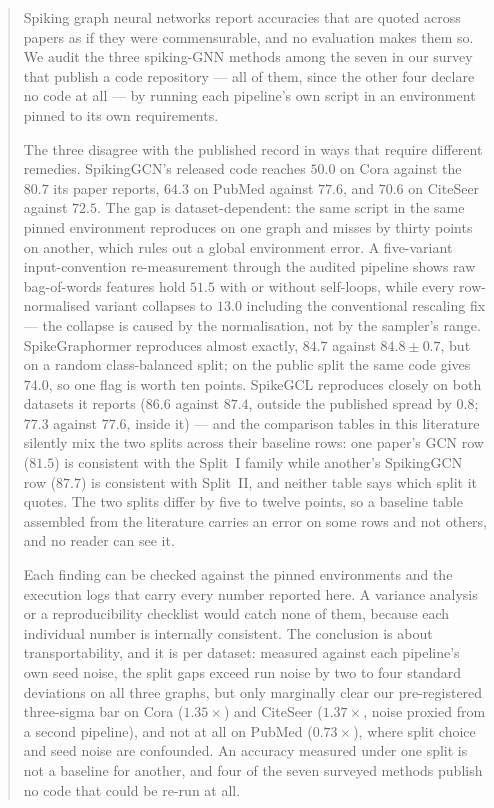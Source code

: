 \begin{abstract}
Spiking graph neural networks report accuracies that are quoted across papers as if they were
commensurable, and no evaluation makes them so. We audit the three spiking-GNN methods among the
seven in our survey that publish a code repository --- all of them, since the other four declare no
code at all --- by running each pipeline's own script in an environment pinned to its own
requirements.

The three disagree with the published record in ways that require different remedies. SpikingGCN's
released code reaches $50.0$ on Cora against the $80.7$ its paper reports, $64.3$ on PubMed against $77.6$,
and $70.6$ on CiteSeer against $72.5$. The gap is dataset-dependent: the same script in the same
pinned environment reproduces on one graph and misses by thirty points on another, which rules out a
global environment error. A five-variant input-convention re-measurement through the audited
pipeline shows raw bag-of-words features hold $51.5$ with or without self-loops, while every
row-normalised variant collapses to $13.0$ including the conventional rescaling fix --- the
collapse is caused by the normalisation, not by the sampler's range.
SpikeGraphormer reproduces almost exactly, $84.7$ against $84.8 \pm 0.7$, but on a random
class-balanced split; on the public split the same code gives $74.0$, so one flag is worth ten
points. SpikeGCL reproduces closely on both datasets it reports ($86.6$ against $87.4$, outside the
published spread by $0.8$; $77.3$ against $77.6$, inside it) --- and the comparison tables in this
literature silently mix the two splits across their baseline rows: one paper's GCN row ($81.5$) is
consistent with the Split~I family while another's SpikingGCN row ($87.7$) is consistent with
Split~II, and neither table says which split it quotes. The two splits differ by five to
twelve points, so a baseline table assembled from the literature carries an error on some rows and
not others, and no reader can see it.

Each finding can be checked against the pinned environments and the execution logs that carry every
number reported here. A variance analysis or a reproducibility checklist would catch none of them,
because each individual number is internally consistent. The conclusion is about transportability,
and it is per dataset: measured against each pipeline's own seed noise, the split gaps exceed run
noise by two to four standard deviations on all three graphs, but only marginally clear our
pre-registered three-sigma bar on Cora ($1.35\times$) and CiteSeer ($1.37\times$, noise proxied
from a second pipeline), and not at all on PubMed ($0.73\times$), where split choice and seed
noise are confounded. An accuracy measured under one split is not a baseline
for another, and four of the seven surveyed methods publish no code that could be re-run at all.
\end{abstract}
